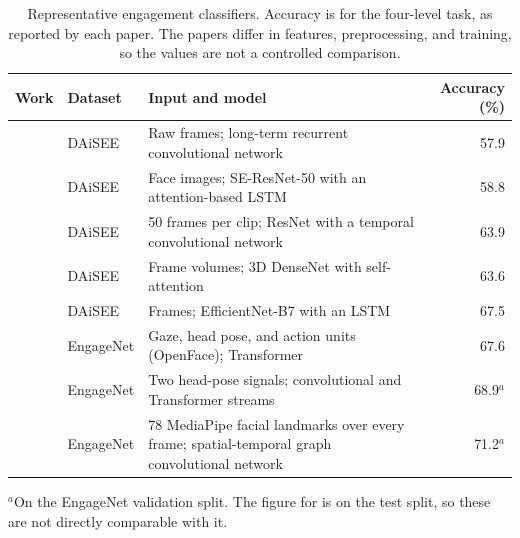 \begin{table}[t]
   \centering
   \caption[Representative engagement classifiers]{Representative engagement classifiers. Accuracy is for the four-level task, as reported by each paper. The papers differ in features, preprocessing, and training, so the values are not a controlled comparison.}
   \label{tab:rw-models}
   \small
   \begin{tabular}{L{3.0cm}L{1.9cm}L{4.5cm}r}
      \toprule
      Work & Dataset & Input and model & Accuracy (\%) \\
      \midrule
       & DAiSEE & Raw frames; long-term recurrent convolutional network & 57.9 \\
       & DAiSEE & Face images; SE-ResNet-50 with an attention-based LSTM & 58.8 \\
       & DAiSEE & 50 frames per clip; ResNet with a temporal convolutional network & 63.9 \\
       & DAiSEE & Frame volumes; 3D DenseNet with self-attention & 63.6 \\
       & DAiSEE & Frames; EfficientNet-B7 with an LSTM & 67.5 \\
       & EngageNet & Gaze, head pose, and action units (OpenFace); Transformer & 67.6 \\
       & EngageNet & Two head-pose signals; convolutional and Transformer streams & 68.9$^{a}$ \\
       & EngageNet & 78 MediaPipe facial landmarks over every frame; spatial-temporal graph convolutional network & 71.2$^{a}$ \\
      \bottomrule
   \end{tabular}

   \vspace{0.5ex}
   {\footnotesize $^{a}$On the EngageNet validation split. The figure for  is on the test split, so these are not directly comparable with it.\par}
\end{table}

